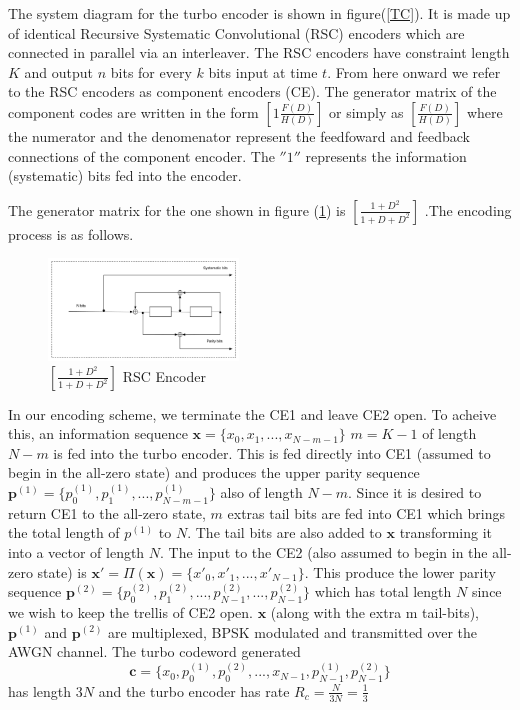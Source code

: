 \documentclass[technicalreport]{ieicej}
\begin{document}
The system diagram for the turbo encoder is shown in figure(\ref{TC}).
 It is made up of identical Recursive Systematic Convolutional (RSC) encoders which 
 are connected
  in parallel via an interleaver. The RSC encoders have constraint length $K$ and output
  $n$ bits for every $k$ bits input at time $t$.
  From here onward we refer to the RSC encoders as component 
encoders (CE). The generator matrix of the component codes are written in 
the form $[1 \frac{F(D)}{H(D)}]$ or simply as $[\frac{F(D)}{H(D)}]$
where the numerator and the denomenator represent the feedfoward and feedback
 connections of the component encoder. The $''1''$ represents the information 
 (systematic) bits fed into the encoder.

 The generator matrix for the one shown in figure (\ref{RSC})
 is $[\frac{1+D^2}{1+D+D^2}]$ .The encoding process is as follows.

\begin{figure}[h!]
\centering
		\includegraphics[width=0.45\textwidth]{RSCExample3.pdf}
		\caption{$[\frac{1+D^2}{1+D+D^2}]$  RSC Encoder}
		\label{RSC}
		\end{figure}


In our encoding scheme, we terminate the CE1 and leave CE2 open. 
To acheive this,	
 an information sequence $\mathbf{x}=\{x_0,x_1,...,x_{N-m-1} \} $
$m=K-1$
of length $N-m$ is fed into the turbo encoder. This is fed directly into CE1 (assumed to 
begin in the all-zero state) and produces the upper parity sequence 
$\mathbf{p}^{(1)}=\{p^{(1)}_0,p^{(1)}_1,...,p^{(1)}_{N-m-1} \}$ also of 
length $N-m$. 
Since it is desired to return CE1 to the all-zero state, $m$ extras tail bits 
are fed into CE1 which brings the total length of $p^{(1)}$ to $N$. The tail bits are
also added to $\mathbf{x}$ transforming it into a vector of length $N$.
The input to the CE2 (also assumed to 
begin in the all-zero state) is 
$\mathbf{x'}=\Pi(\mathbf{x})= \{x'_0,x'_1,...,x'_{N-1} \} $. This produce the lower 
parity sequence 
$\mathbf{p}^{(2)}=\{p^{(2)}_0,p^{(2)}_1,...,p^{(2)}_{N-1},...,p^{(2)}_{N-1} \}$
 which has total length $N$ since we wish to keep the trellis of CE2 open.
 $\mathbf{x}$ (along with the extra m tail-bits), $\mathbf{p}^{(1)}$
 and $\mathbf{p}^{(2)}$ are multiplexed, BPSK modulated and transmitted over the
 AWGN channel.
 The turbo codeword generated  
 $$\mathbf{c}=\{x_0,p^{(1)}_0,p^{(2)}_0,...,x_{N-1},p^{(1)}_{N-1},p^{(2)}_{N-1} \} $$ 
 has length $3N$ and the
 turbo encoder has rate $R_c=\frac{N}{3N} = \frac{1}{3}$
 
\end{document}
